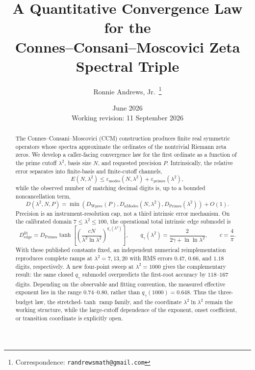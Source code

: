 \documentclass[11pt,a4paper]{article}
\title{A Quantitative Convergence Law for the\\
Connes--Consani--Moscovici Zeta Spectral Triple}
\author{Ronnie Andrews, Jr.\,\orcidlink{0009-0003-9724-3104}%
\thanks{Correspondence: \texttt{randrewsmath@gmail.com}}}
\date{June 2026\\[2pt]{\small Working revision: 11 September 2026}}
\begin{document}
\maketitle

\begin{abstract}
The Connes--Consani--Moscovici (CCM) construction produces finite real
symmetric operators whose spectra approximate the ordinates of the
nontrivial Riemann zeta zeros. We develop a caller-facing convergence law for
the first ordinate as a function of the prime cutoff $\lambda^2$, basis size
$N$, and requested precision $P$. Intrinsically, the relative error separates
into finite-basis and finite-cutoff channels,
\[
 E(N,\lambda^2)\le
 \varepsilon_{\mathrm{modes}}(N,\lambda^2)
 +\varepsilon_{\mathrm{primes}}(\lambda^2),
\]
while the observed number of matching decimal digits is, up to a bounded
noncancellation term,
\[
 D(\lambda^2,N,P)=\min\!\left(
 D_{\mathrm{Wprec}}(P),D_{\mathrm{nModes}}(N,\lambda^2),
 D_{\mathrm{Primes}}(\lambda^2)\right)+O(1).
\]
Precision is an instrument-resolution cap, not a third intrinsic error
mechanism. On the calibrated domain $7\le\lambda^2\le100$, the operational
total intrinsic edge submodel is
\[
 D_{\mathrm{edge}}^{\mathrm{fit}}=D_{\mathrm{Primes}}
 \tanh\!\left[\left(\frac{cN}{\lambda^2\ln\lambda^2}\right)^{q_\gamma(\lambda^2)}\right],
 \qquad
 q_\gamma(\lambda^2)=\frac{2}{2\gamma+\ln\ln\lambda^2},
 \qquad c=\frac4\pi .
\]
With these published constants fixed, an independent numerical
reimplementation reproduces complete ramps at $\lambda^2=7,13,20$ with RMS
errors $0.47$, $0.66$, and $1.18$ digits, respectively. A new four-point
sweep at $\lambda^2=1000$ gives the complementary result: the same closed
$q_\gamma$ submodel overpredicts the first-root accuracy by $118$--$167$
digits. Depending on the observable and fitting convention, the measured
effective exponent lies in the range $0.74$--$0.80$, rather than
$q_\gamma(1000)=0.648$. Thus the three-budget law, the stretched-$\tanh$
ramp family, and the coordinate $\lambda^2\ln\lambda^2$ remain the working
structure, while the large-cutoff dependence of the exponent, onset
coefficient, or transition coordinate is explicitly open.


\end{abstract}
\end{document}
